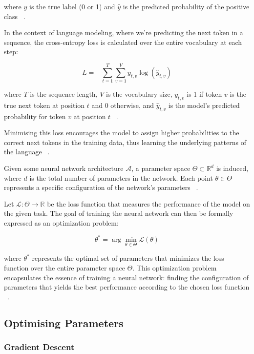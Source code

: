 \documentclass[a4paper, oneside]{discothesis}
\begin{document}
where $y$ is the true label (0 or 1) and $\hat{y}$ is the predicted probability of the positive class ~\cite{bishop2006pattern}.

In the context of language modeling, where we're predicting the next token in a sequence, the cross-entropy loss is calculated over the entire vocabulary at each step:

\begin{equation}
    L = -\sum_{t=1}^T \sum_{v=1}^V y_{t,v} \log(\hat{y}_{t,v})
\end{equation}

where $T$ is the sequence length, $V$ is the vocabulary size, $y_{t,v}$ is 1 if token $v$ is the true next token at position $t$ and 0 otherwise, and $\hat{y}_{t,v}$ is the model's predicted probability for token $v$ at position $t$ ~\cite{jurafsky2009speech}.

Minimising this loss encourages the model to assign higher probabilities to the correct next tokens in the training data, thus learning the underlying patterns of the language ~\cite{bengio2003neural}.

Given some neural network architecture $\mathcal{A}$, a parameter space $\Theta \subset \mathbb{R}^d$ is induced, where $d$ is the total number of parameters in the network. Each point $\theta \in \Theta$ represents a specific configuration of the network's parameters ~\cite{lecun2015deep}.

Let $\mathcal{L}: \Theta \rightarrow \mathbb{R}$ be the loss function that measures the performance of the model on the given task. The goal of training the neural network can then be formally expressed as an optimization problem:

\begin{equation}
    \theta^* = \arg\min_{\theta \in \Theta} \mathcal{L}(\theta)
\end{equation}

where $\theta^*$ represents the optimal set of parameters that minimizes the loss function over the entire parameter space $\Theta$. This optimization problem encapsulates the essence of training a neural network: finding the configuration of parameters that yields the best performance according to the chosen loss function ~\cite{rumelhart1986learning}.


\subsection{Optimising Parameters}

\subsubsection{Gradient Descent}
\end{document}
